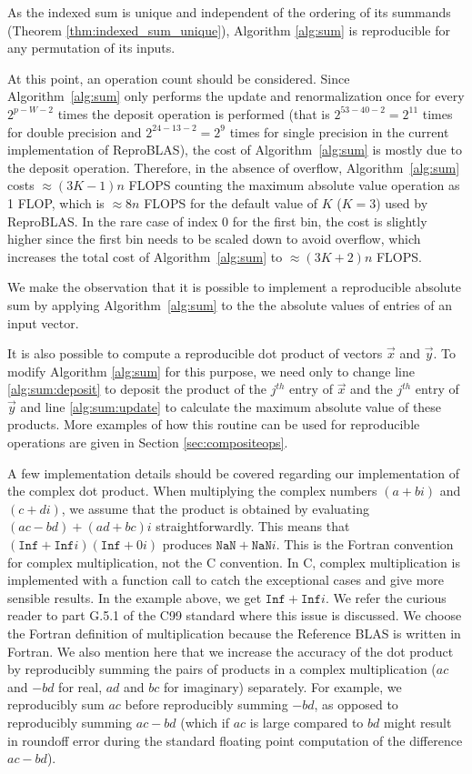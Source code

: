    As the indexed sum is unique and independent of the ordering of its summands (Theorem \ref{thm:indexed_sum_unique}), Algorithm \ref{alg:sum} is reproducible for any permutation of its inputs.

    At this point, an operation count should be considered. Since Algorithm~\ref{alg:sum} only performs the update and renormalization
  once for every $2^{p-W-2}$ times the deposit operation is performed (that
is $2^{53-40-2}=2^{11}$ times for double precision and $2^{24-13-2} = 2^9$ times for single precision in the current implementation of
  ReproBLAS), the cost of Algorithm~\ref{alg:sum} is mostly due to the
  deposit operation.
  Therefore, in the absence of overflow, Algorithm~\ref{alg:sum} costs
  $\approx (3K-1)n$ FLOPS counting the maximum absolute value operation as 1 FLOP,
  which is $\approx 8n$ FLOPS for the default value of $K$ ($K=3$) used by ReproBLAS.
  In the rare case of index 0 for the first bin,
  the cost is slightly higher since the first bin
  needs to be scaled down to avoid overflow, which increases the
  total cost of Algorithm~\ref{alg:sum} to $\approx (3K+2)n$ FLOPS.

  We make the observation that it is possible to implement a reproducible absolute sum by applying Algorithm~\ref{alg:sum} to the the absolute values of entries of an input vector.

  It is also possible to compute a reproducible dot product of vectors $\vec{x}$ and $\vec{y}$. To modify Algorithm \ref{alg:sum} for this purpose, we need only to change line  \ref{alg:sum:deposit} to deposit the product of the $j^{th}$ entry of $\vec{x}$ and the $j^{th}$ entry of $\vec{y}$ and line \ref{alg:sum:update} to calculate the maximum absolute value of these products. More examples of how this routine can be used for reproducible operations are given in Section \ref{sec:compositeops}.

  A few implementation details should be covered regarding our implementation of the complex dot product. When multiplying the complex numbers $(a + bi)$ and $(c + di)$, we assume that the product is obtained by evaluating $(ac - bd) + (ad + bc)i$ straightforwardly. This means that $(\texttt{Inf} + \texttt{Inf}i)(\texttt{Inf} + 0i)$ produces $\texttt{NaN} + \texttt{NaN}i$.
  This is the Fortran convention for complex multiplication, not the C convention. In C, complex multiplication is implemented with a function call to catch the exceptional cases and give more sensible results. In the example above, we get $\texttt{Inf} + \texttt{Inf}i$. We refer the curious reader to part G.5.1 of the C99 standard \cite{c99} where this issue is discussed. We choose the Fortran definition of multiplication because the Reference BLAS is written in Fortran. We also mention here that we increase the accuracy of the dot product by reproducibly summing the pairs of products in a complex multiplication ($ac$ and $-bd$ for real, $ad$ and $bc$ for imaginary) separately. For example, we reproducibly sum $ac$ before reproducibly summing $-bd$, as opposed to reproducibly summing $ac - bd$ (which if $ac$ is large compared to $bd$ might result in roundoff error during the standard floating point computation of the difference $ac - bd$).


